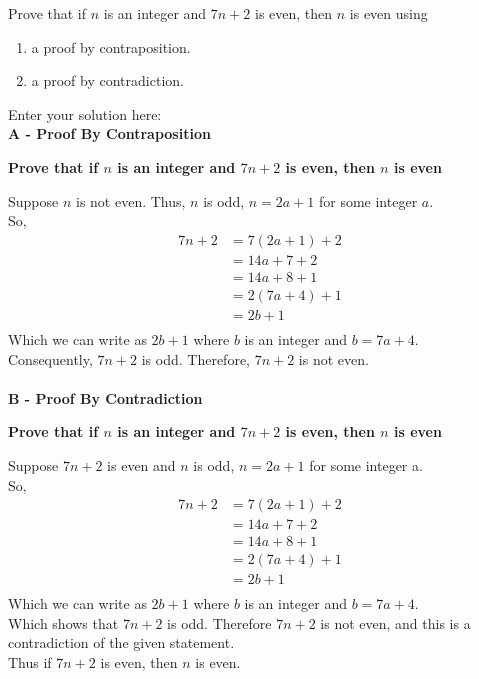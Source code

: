 \documentclass[10pt]{exam}
\begin{document}
\begin{questions}
\question[10] Prove that if $n$ is an integer and $7n+2$ is even, then $n$ is even using

\begin{enumerate} [label=(\alph*)]
  \item a proof by contraposition.
  \item a proof by contradiction.
\end{enumerate}

\begin{solution}
Enter your solution here: \\
\textbf{A - Proof By Contraposition}
    \begin{center}
    \textbf{Prove that if $n$ is an integer and $7n+2$ is even, then $n$ is even}
    \end{center}
    Suppose $n$ is not even. Thus, $n$ is odd, $n = 2a + 1$ for some integer $a$.\\
    So,
    \begin{align*}
    7n + 2 &= 7(2a + 1) + 2\\
    &= 14a + 7 + 2\\
    &= 14a + 8 + 1\\
    &= 2(7a + 4) + 1\\
    &= 2b + 1\\
    \end{align*}
    Which we can write as $2b + 1$ where $b$ is an integer and $b = 7a + 4$. \\
    Consequently, $7n + 2$ is odd. Therefore, $7n + 2$ is not even.  \\
    \\
\textbf{B - Proof By Contradiction}
    \begin{center}
    \textbf{Prove that if $n$ is an integer and $7n+2$ is even, then $n$ is even}
    \end{center}
    Suppose $7n + 2$ is even and $n$ is odd, $n = 2a + 1$ for some integer a.\\
    So,
    \begin{align*}
    7n + 2 &= 7(2a + 1) + 2\\
    &= 14a + 7 + 2\\
    &= 14a + 8 + 1\\
    &= 2(7a + 4) + 1\\
    &= 2b + 1\\
    \end{align*}
    Which we can write as $2b + 1$ where $b$ is an integer and $b = 7a + 4$. \\
    Which shows that $7n + 2$ is odd. Therefore $7n + 2$ is not even, and this is a contradiction of the given statement.  \\
    Thus if $7n + 2$ is even, then $n$ is even.
\end{solution}


\end{questions}
\end{document}
